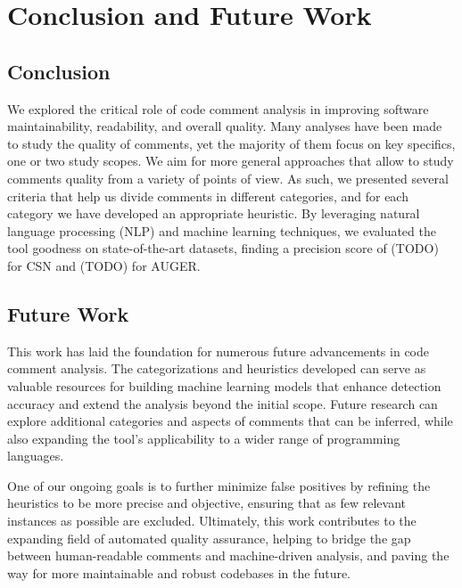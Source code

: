 
\chapter{Conclusion and Future Work} %

\label{Chapter5}


\section{Conclusion}
We explored the critical role of code comment analysis in improving software maintainability, readability, and overall quality. Many analyses have been made to study the quality of comments, yet the majority of them focus on key specifics, one or two study scopes. We aim for more general approaches that allow to study comments quality from a variety of points of view. As such, we presented several criteria that help us divide comments in different categories, and for each category we have developed an appropriate heuristic. By leveraging natural language processing (NLP) and machine learning techniques, we evaluated the tool goodness on state-of-the-art datasets, finding a precision score of (TODO) for CSN and (TODO) for AUGER.

\section{Future Work}
This work has laid the foundation for numerous future advancements in code comment analysis. The categorizations and heuristics developed can serve as valuable resources for building machine learning models that enhance detection accuracy and extend the analysis beyond the initial scope. Future research can explore additional categories and aspects of comments that can be inferred, while also expanding the tool's applicability to a wider range of programming languages.

\noindent One of our ongoing goals is to further minimize false positives by refining the heuristics to be more precise and objective, ensuring that as few relevant instances as possible are excluded. Ultimately, this work contributes to the expanding field of automated quality assurance, helping to bridge the gap between human-readable comments and machine-driven analysis, and paving the way for more maintainable and robust codebases in the future.
